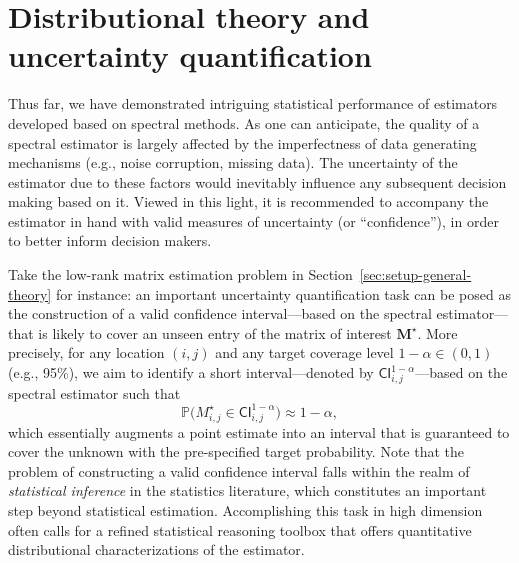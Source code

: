 


\section{Distributional theory and uncertainty quantification}
\label{sec:distribution-theory}


Thus far, we have demonstrated intriguing statistical performance of estimators developed based on spectral methods. 
As one can anticipate, the quality of a spectral estimator is largely affected by the imperfectness of data generating mechanisms (e.g., noise corruption, missing data). 
The uncertainty of the estimator due to these factors would inevitably influence any subsequent decision making based on it. 
Viewed in this light, it is recommended to accompany the estimator in hand with valid measures of uncertainty (or ``confidence''), 
in order to better inform decision makers.  


Take the low-rank matrix estimation problem in Section~\ref{sec:setup-general-theory} for instance:  
an important uncertainty quantification task can be posed as the construction of a valid confidence
interval---based on the spectral estimator---that is likely to cover an unseen entry of the matrix of interest $\bm{M}^{\star}$. 
More precisely, for any location $(i,j)$ and any target coverage level $1-\alpha \in (0,1)$ (e.g., 95\%), we aim to identify a short interval---denoted by $\mathsf{CI}_{i,j}^{1-\alpha}$---based on the spectral estimator such that
%
\begin{equation}
	\mathbb{P}\big( M_{i,j}^{\star} \in \mathsf{CI}_{i,j}^{1-\alpha} \big) \approx 1-\alpha,  
\end{equation}
%
which essentially augments a point estimate into an interval that is guaranteed to cover the unknown with the pre-specified target probability.  
Note that the problem of constructing a valid confidence interval falls within the realm of {\em statistical inference} in the statistics literature,
which constitutes an important step beyond statistical estimation. 
Accomplishing this task in high dimension often calls for a refined statistical reasoning toolbox that offers quantitative distributional characterizations of the estimator. 



%


